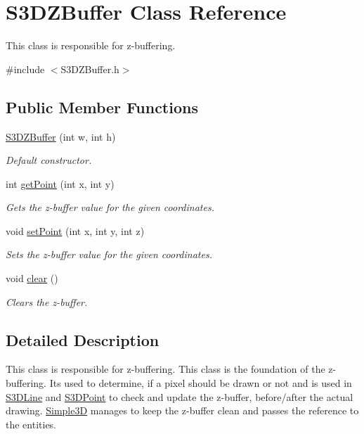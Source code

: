 \hypertarget{class_s3_d_z_buffer}{
\section{S3DZBuffer Class Reference}
\label{class_s3_d_z_buffer}
}


This class is responsible for z-\/buffering.  




{\ttfamily \#include $<$S3DZBuffer.h$>$}

\subsection*{Public Member Functions}
\begin{DoxyCompactItemize}
\item 
\hyperlink{class_s3_d_z_buffer_a8983fb4278e5baaa4bdf076f8e28d940}{S3DZBuffer} (int w, int h)
\begin{DoxyCompactList}\small\item\em Default constructor. \item\end{DoxyCompactList}\item 
int \hyperlink{class_s3_d_z_buffer_aba5f79850772a0500a629443e413e402}{getPoint} (int x, int y)
\begin{DoxyCompactList}\small\item\em Gets the z-\/buffer value for the given coordinates. \item\end{DoxyCompactList}\item 
void \hyperlink{class_s3_d_z_buffer_aa712e633bf2ccf4c43bb27178a1692c1}{setPoint} (int x, int y, int z)
\begin{DoxyCompactList}\small\item\em Sets the z-\/buffer value for the given coordinates. \item\end{DoxyCompactList}\item 
void \hyperlink{class_s3_d_z_buffer_ab2b22d8f910724846765813cc6e8457e}{clear} ()
\begin{DoxyCompactList}\small\item\em Clears the z-\/buffer. \item\end{DoxyCompactList}\end{DoxyCompactItemize}


\subsection{Detailed Description}
This class is responsible for z-\/buffering. This class is the foundation of the z-\/buffering. Its used to determine, if a pixel should be drawn or not and is used in \hyperlink{class_s3_d_line}{S3DLine} and \hyperlink{class_s3_d_point}{S3DPoint} to check and update the z-\/buffer, before/after the actual drawing. \hyperlink{class_simple3_d}{Simple3D} manages to keep the z-\/buffer clean and passes the reference to the entities. 

